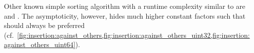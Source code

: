 

\begin{note}
	Other known simple sorting algorithm with a runtime complexity similar to \IS{} are \SelS{} and \BS{}.
	The asymptoticity, however, hides much higher constant factors such that \IS{} should always be preferred (cf.\ \cref{fig:insertion:against_others,fig:insertion:against_others_uint32,fig:insertion:against_others_uint64}).
\end{note}
